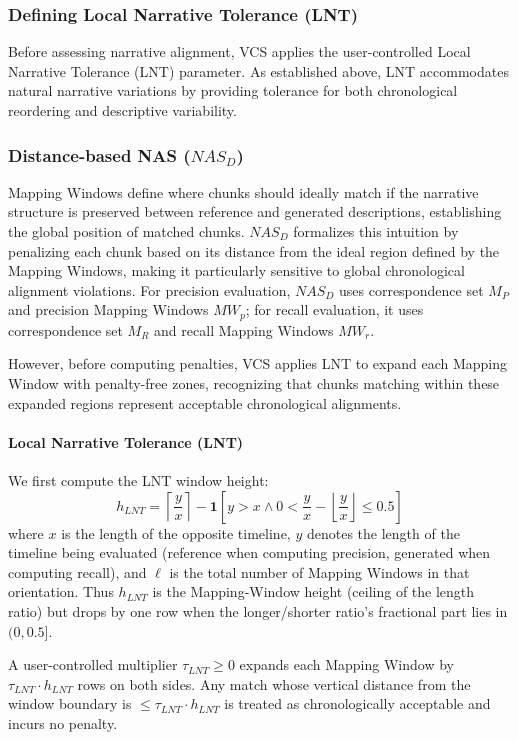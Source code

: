 \documentclass[main.tex]{subfiles}
\begin{document}
\subsubsection{Defining Local Narrative Tolerance (LNT)}
Before assessing narrative alignment, VCS applies the user-controlled Local Narrative Tolerance (LNT) parameter. As established above, LNT accommodates natural narrative variations by providing tolerance for both chronological reordering and descriptive variability.

\subsubsection{Distance-based NAS ($NAS_D$)}
Mapping Windows define where chunks should ideally match if the narrative structure is preserved between reference and generated descriptions, establishing the global position of matched chunks. $NAS_D$ formalizes this intuition by penalizing each chunk based on its distance from the ideal region defined by the Mapping Windows, making it particularly sensitive to global chronological alignment violations. For precision evaluation, $NAS_D$ uses correspondence set $M_P$ and precision Mapping Windows $MW_p$; for recall evaluation, it uses correspondence set $M_R$ and recall Mapping Windows $MW_r$.

However, before computing penalties, VCS applies LNT to expand each Mapping Window with penalty-free zones, recognizing that chunks matching within these expanded regions represent acceptable chronological alignments.

\paragraph{Local Narrative Tolerance (LNT)}
We first compute the LNT window height:
\begin{equation}
h_{LNT} = \left\lceil \frac{y}{x} \right\rceil - \mathbf{1}[y > x \land 0 < \frac{y}{x} - \left\lfloor \frac{y}{x} \right\rfloor \leq 0.5]
\end{equation}
where $x$ is the length of the opposite timeline, $y$ denotes the length of the timeline being evaluated (reference when computing precision, generated when computing recall), and $\ell$ is the total number of Mapping Windows in that orientation. Thus $h_{LNT}$ is the Mapping-Window height (ceiling of the length ratio) but drops by one row when the longer/shorter ratio's fractional part lies in $(0, 0.5]$.

A user-controlled multiplier $\tau_{LNT} \geq 0$ expands each Mapping Window by $\tau_{LNT} \cdot h_{LNT}$ rows on both sides. Any match whose vertical distance from the window boundary is $\leq \tau_{LNT} \cdot h_{LNT}$ is treated as chronologically acceptable and incurs no penalty.
\end{document}
